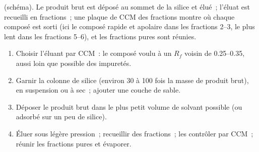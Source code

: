 \begin{omfigure}
\par\vspace{4pt}

{\small {} (schéma). Le produit brut est déposé au sommet de la silice et élué~;
l'éluat est recueilli en fractions~; une plaque de CCM des fractions montre où chaque composé est sorti
(ici le composé rapide et apolaire dans les fractions 2--3, le plus lent dans les fractions 5--6), et les
fractions pures sont réunies.}
\end{omfigure}

\begin{method}\label{met:b2:lab-techniques-2:flash}
\begin{enumerate}
  \item Choisir l'éluant par CCM~: le composé voulu à un $R_f$ voisin de 0.25--0.35, aussi loin que
        possible des impuretés.
  \item Garnir la colonne de silice (environ 30 à 100 fois la masse de produit brut), en suspension ou à
        sec~; ajouter une couche de sable.
  \item Déposer le produit brut dans le plus petit volume de solvant possible (ou adsorbé sur un peu de silice).
  \item Éluer sous légère pression~; recueillir des fractions~; les contrôler par CCM~; réunir les fractions
        pures et évaporer.
\end{enumerate}
\end{method}

